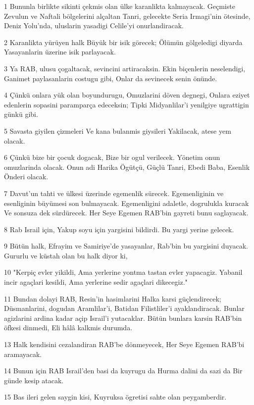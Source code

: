 \par 1 Bununla birlikte sikinti çekmis olan ülke karanlikta kalmayacak. Geçmiste Zevulun ve Naftali bölgelerini alçaltan Tanri, gelecekte Seria Irmagi'nin ötesinde, Deniz Yolu'nda, uluslarin yasadigi Celile'yi onurlandiracak.
\par 2 Karanlikta yürüyen halk Büyük bir isik görecek; Ölümün gölgeledigi diyarda Yasayanlarin üzerine isik parlayacak.
\par 3 Ya RAB, ulusu çogaltacak, sevincini artiracaksin. Ekin biçenlerin neselendigi, Ganimet paylasanlarin costugu gibi, Onlar da sevinecek senin önünde.
\par 4 Çünkü onlara yük olan boyundurugu, Omuzlarini döven degnegi, Onlara eziyet edenlerin sopasini paramparça edeceksin; Tipki Midyanlilar'i yenilgiye ugrattigin günkü gibi.
\par 5 Savasta giyilen çizmeleri Ve kana bulanmis giysileri Yakilacak, atese yem olacak.
\par 6 Çünkü bize bir çocuk dogacak, Bize bir ogul verilecek. Yönetim onun omuzlarinda olacak. Onun adi Harika Ögütçü, Güçlü Tanri, Ebedi Baba, Esenlik Önderi olacak.
\par 7 Davut'un tahti ve ülkesi üzerinde egemenlik sürecek. Egemenliginin ve esenliginin büyümesi son bulmayacak. Egemenligini adaletle, dogrulukla kuracak Ve sonsuza dek sürdürecek. Her Seye Egemen RAB'bin gayreti bunu saglayacak.
\par 8 Rab Israil için, Yakup soyu için yargisini bildirdi. Bu yargi yerine gelecek.
\par 9 Bütün halk, Efrayim ve Samiriye'de yasayanlar, Rab'bin bu yargisini duyacak. Gururlu ve küstah olan bu halk diyor ki,
\par 10 "Kerpiç evler yikildi, Ama yerlerine yontma tastan evler yapacagiz. Yabanil incir agaçlari kesildi, Ama yerlerine sedir agaçlari dikecegiz."
\par 11 Bundan dolayi RAB, Resin'in hasimlarini Halka karsi güçlendirecek; Düsmanlarini, dogudan Aramlilar'i, Batidan Filistliler'i ayaklandiracak. Bunlar agizlarini ardina kadar açip Israil'i yutacaklar. Bütün bunlara karsin RAB'bin öfkesi dinmedi, Eli hâlâ kalkmis durumda.
\par 13 Halk kendisini cezalandiran RAB'be dönmeyecek, Her Seye Egemen RAB'bi aramayacak.
\par 14 Bunun için RAB Israil'den basi da kuyrugu da Hurma dalini da sazi da Bir günde kesip atacak.
\par 15 Bas ileri gelen saygin kisi, Kuyruksa ögretisi sahte olan peygamberdir.

